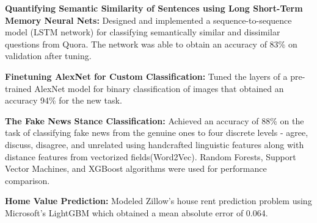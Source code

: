 %
\begin{cventries}
\vspace{-5mm}
  \cventry
    {}
    {}
    {}
    {}
    {
      \begin{cvitems}
      \item {{ \textbf{Quantifying Semantic Similarity of Sentences using Long Short-Term Memory Neural Nets:} Designed and implemented a sequence-to-sequence model (LSTM network) for classifying semantically similar and dissimilar questions from Quora. The network was able to obtain an accuracy of 83\% on validation after tuning.}}
      \item {{\textbf{Finetuning AlexNet for Custom Classification:} Tuned the layers of a pre-trained AlexNet model for binary classification of images that obtained an accuracy 94\% for the new task.}}
      \item { \textbf{The Fake News Stance Classification:} Achieved an accuracy of 88\% on the task of classifying fake news from the genuine ones to four discrete levels - agree, discuss, disagree, and unrelated using handcrafted linguistic features along with distance features from vectorized fields(Word2Vec). Random Forests, Support Vector Machines, and XGBoost algorithms were used for performance comparison.}
      \item { \textbf{Home Value Prediction:} Modeled Zillow's house rent prediction problem using Microsoft's LightGBM which obtained a mean absolute error of 0.064.}
      \end{cvitems}
    }
\end{cventries}
